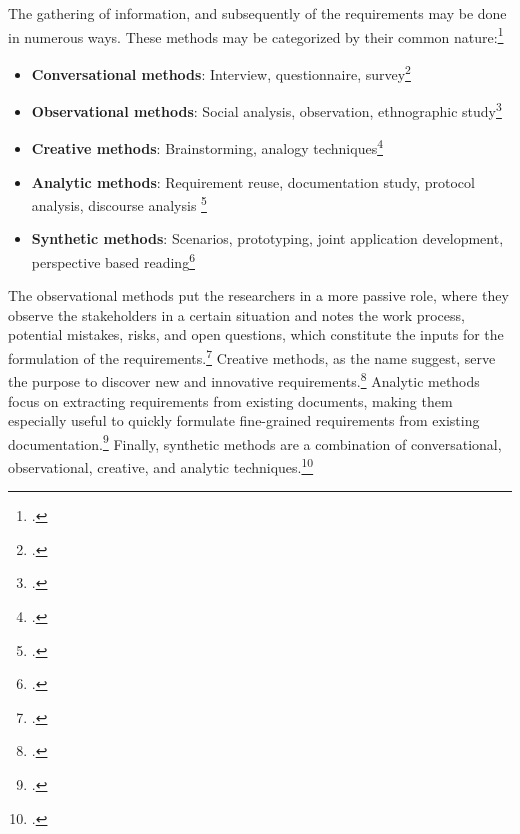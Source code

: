 The gathering of information, and subsequently of the requirements may be done in numerous ways. These methods may be categorized by their common nature:\footcite[Cf.][p.170]{HickeyElicitationtechniqueselection2003} 
\begin{itemize}
    \item \textbf{Conversational methods}: Interview, questionnaire, survey\footcites[Cf.][chapter 3]{PohlRequirementsengineeringfundamentals2011}[cf.][p.170]{HickeyElicitationtechniqueselection2003}
    \item \textbf{Observational methods}: Social analysis, observation, ethnographic study\footcites[Cf.][p.227]{ZhangEffectiverequirementsdevelopmentA2007}[cf.][p.173]{HickeyElicitationtechniqueselection2003}
    \item \textbf{Creative methods}: Brainstorming, analogy techniques\footcite[Cf.][chapter 3]{PohlRequirementsengineeringfundamentals2011}
    \item \textbf{Analytic methods}: Requirement reuse, documentation study, protocol analysis, discourse analysis \footcites[Cf.][p.12]{GoguenTechniquesrequirementelicitation1993}[cf.][pp.227-228]{ZhangEffectiverequirementsdevelopmentA2007}[cf.][p.2]{TiwariMethodologySelectionRequirement2017}
    \item \textbf{Synthetic methods}: Scenarios, prototyping, joint application development, perspective based reading\footcites[Cf.][p.228]{ZhangEffectiverequirementsdevelopmentA2007}[cf.][chapter 3]{PohlRequirementsengineeringfundamentals2011}[cf.][p.3]{TiwariMethodologySelectionRequirement2017}
\end{itemize}

The observational methods put the researchers in a more passive role, where they observe the stakeholders in a certain situation and notes the work process, potential mistakes, risks, and open questions, which constitute the inputs for the formulation of the requirements.\footcite[Cf.][chapter 3]{PohlRequirementsengineeringfundamentals2011} Creative methods, as the name suggest, serve the purpose to discover new and innovative requirements.\footcite[Cf.][chapter 3]{PohlRequirementsengineeringfundamentals2011} Analytic methods focus on extracting requirements from existing documents, making them especially useful to quickly formulate fine-grained requirements from existing documentation.\footcite[Cf.][p.228]{ZhangEffectiverequirementsdevelopmentA2007} Finally, synthetic methods are a combination of conversational, observational, creative, and analytic techniques.\footcite[Cf.][p.228]{ZhangEffectiverequirementsdevelopmentA2007} 

